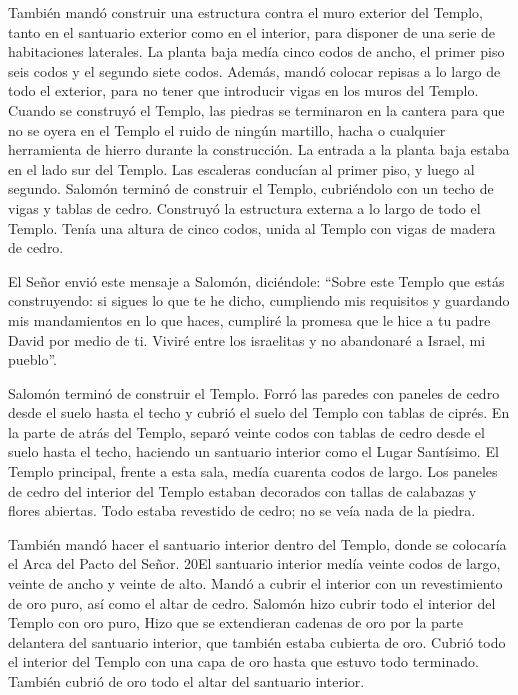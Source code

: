  También mandó construir una estructura contra el muro
exterior del Templo, tanto en el santuario exterior como en el interior,
para disponer de una serie de habitaciones laterales.  La
planta baja medía cinco codos de ancho, el primer piso seis codos y el
segundo siete codos. Además, mandó colocar repisas a lo largo de todo el
exterior, para no tener que introducir vigas en los muros del Templo.
 Cuando se construyó el Templo, las piedras se terminaron en
la cantera para que no se oyera en el Templo el ruido de ningún
martillo, hacha o cualquier herramienta de hierro durante la
construcción.  La entrada a la planta baja estaba en el lado
sur del Templo. Las escaleras conducían al primer piso, y luego al
segundo.  Salomón terminó de construir el Templo,
cubriéndolo con un techo de vigas y tablas de cedro. 
Construyó la estructura externa a lo largo de todo el Templo. Tenía una
altura de cinco codos, unida al Templo con vigas de madera de cedro.

 El Señor envió este mensaje a Salomón, diciéndole:
 ``Sobre este Templo que estás construyendo: si sigues lo
que te he dicho, cumpliendo mis requisitos y guardando mis mandamientos
en lo que haces, cumpliré la promesa que le hice a tu padre David por
medio de ti.  Viviré entre los israelitas y no abandonaré a
Israel, mi pueblo''.

 Salomón terminó de construir el Templo. 
Forró las paredes con paneles de cedro desde el suelo hasta el techo y
cubrió el suelo del Templo con tablas de ciprés.  En la
parte de atrás del Templo, separó veinte codos con tablas de cedro desde
el suelo hasta el techo, haciendo un santuario interior como el Lugar
Santísimo.  El Templo principal, frente a esta sala, medía
cuarenta codos de largo.  Los paneles de cedro del interior
del Templo estaban decorados con tallas de calabazas y flores abiertas.
Todo estaba revestido de cedro; no se veía nada de la piedra.

 También mandó hacer el santuario interior dentro del
Templo, donde se colocaría el Arca del Pacto del Señor. 20El santuario
interior medía veinte codos de largo, veinte de ancho y veinte de alto.
Mandó a cubrir el interior con un revestimiento de oro puro, así como el
altar de cedro.  Salomón hizo cubrir todo el interior del
Templo con oro puro, Hizo que se extendieran cadenas de oro por la parte
delantera del santuario interior, que también estaba cubierta de oro.
 Cubrió todo el interior del Templo con una capa de oro
hasta que estuvo todo terminado. También cubrió de oro todo el altar del
santuario interior.

